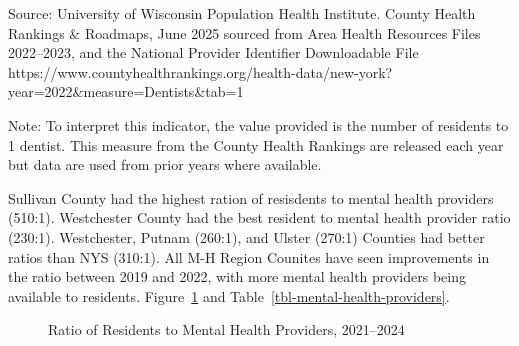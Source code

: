 \documentclass[
  english,
  letterpaper,
]{report}
\begin{document}
\begin{tcolorbox}[enhanced jigsaw, breakable, leftrule=.75mm, title=\textcolor{quarto-callout-note-color}{\faInfo}\hspace{0.5em}{Source}, bottomrule=.15mm, opacityback=0, left=2mm, colback=white, bottomtitle=1mm, coltitle=black, colbacktitle=quarto-callout-note-color!10!white, colframe=quarto-callout-note-color-frame, opacitybacktitle=0.6, toptitle=1mm, titlerule=0mm, arc=.35mm, rightrule=.15mm, toprule=.15mm]

Source: University of Wisconsin Population Health Institute. County
Health Rankings \& Roadmaps, June 2025 sourced from Area Health
Resources Files 2022--2023, and the National Provider Identifier
Downloadable File
https://www.countyhealthrankings.org/health-data/new-york?year=2022\&measure=Dentists\&tab=1

\end{tcolorbox}

\begin{tcolorbox}[enhanced jigsaw, breakable, leftrule=.75mm, title=\textcolor{quarto-callout-note-color}{\faInfo}\hspace{0.5em}{Note}, bottomrule=.15mm, opacityback=0, left=2mm, colback=white, bottomtitle=1mm, coltitle=black, colbacktitle=quarto-callout-note-color!10!white, colframe=quarto-callout-note-color-frame, opacitybacktitle=0.6, toptitle=1mm, titlerule=0mm, arc=.35mm, rightrule=.15mm, toprule=.15mm]

Note: To interpret this indicator, the value provided is the number of
residents to 1 dentist. This measure from the County Health Rankings are
released each year but data are used from prior years where available.

\end{tcolorbox}

Sullivan County had the highest ration of resisdents to mental health
providers (510:1). Westchester County had the best resident to mental
health provider ratio (230:1). Westchester, Putnam (260:1), and Ulster
(270:1) Counties had better ratios than NYS (310:1). All M-H Region
Counites have seen improvements in the ratio between 2019 and 2022, with
more mental health providers being available to residents.
Figure~\ref{fig-mental-health-providers} and
Table~\ref{tbl-mental-health-providers}.

\begin{figure}


\caption{\label{fig-mental-health-providers}Ratio of Residents to Mental
Health Providers, 2021--2024}

\end{figure}%
\end{document}
